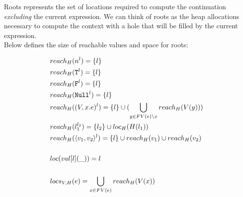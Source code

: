 \documentclass[11pt]{article}
\newcommand{\irl}[1]{\mathtt{#1}}
\begin{document}
Roots represents the set of locations required to compute the continuation \emph{excluding} the current expression.
We can think of roots as the heap allocations necessary to compute the context with a hole that will be filled
by the current expression.\\

Below defines the size of reachable values and space for roots:

\begin{align*}
  &reach_{H}(n^l) = \{l\}\\
  &reach_{H}(\irl{T}^l) = \{l\}\\
  &reach_{H}(\irl{F}^l) = \{l\}\\
  &reach_{H}(\irl{Null}^l) = \{l\}\\
  &reach_{H}((V, x.e)^l) = \{l\} \cup (\bigcup\limits_{y \in FV(e) \setminus x} reach_H(V(y))) \\
  &reach_{H}(l_1^{l_2}) = \{l_2\} \cup loc_{H}(H(l_1))\\
  &reach_{H}(\pairexcst{v_1}{v_2}^l) = \{l\} \cup reach_{H}(v_1) \cup reach_{H}(v_2)\\\\
  &loc(val[l](\_)) = l\\\\
  &locs_{V,H}(e) = \bigcup\limits_{x \in FV(e)} reach_H(V(x))
\end{align*}
\end{document}
